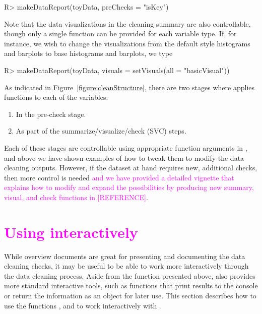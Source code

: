 \documentclass[article,shortnames]{jss}
\newcommand{\hl}[1]{\textcolor{magenta}{#1}}
\begin{document}
\begin{Schunk}
\begin{Sinput}
R> makeDataReport(toyData, preChecks = "isKey")
\end{Sinput}
\end{Schunk}

Note that the data visualizations in the cleaning summary are also
controllable, though only a single function can be provided for each variable type. If, for instance, we wish to change the visualizations
from the default  \citep{ggplot2} style histograms and barplots to base
 histograms and barplots, we type

\begin{Schunk}
\begin{Sinput}
R> makeDataReport(toyData, visuals = setVisuals(all = "basicVisual"))
\end{Sinput}
\end{Schunk}


As indicated in Figure~\ref{figure:cleanStructure}, there are two stages
where  applies functions to each of the variables:
\begin{enumerate}
\item In the pre-check stage.
\item As part of the summarize/visualize/check (SVC) steps.
\end{enumerate}
Each of these stages are controllable using appropriate function
arguments in , and above we have shown examples of how
to tweak them to modify the data cleaning outputs. However, if the
dataset at hand requires new, additional checks, then more control is
needed \hl{ and we have provided a detailed vignette that explains how to modify and
expand the possibilities by producing new summary, visual, and check
functions in [REFERENCE]}.


\section[Using dataMaid interactively]{\hl{Using  interactively}}
\label{sec:interactiveCleanR}

While overview documents are great for presenting and documenting the
data cleaning checks, it may be useful to be able to work more
interactively through the data cleaning process. Aside from
the  function presented above,  also
provides more standard  interactive tools, such as
functions that print results to the console or return the information
as an object for later use. This section describes how to use the
functions ,  and  to
work interactively with .
\end{document}
